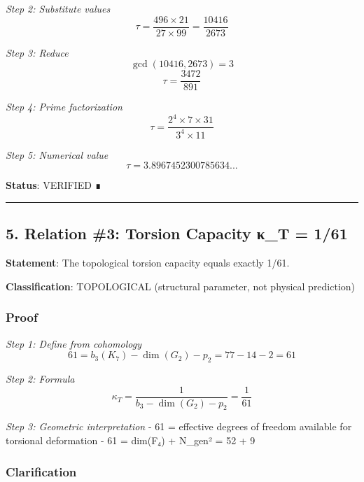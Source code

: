 \documentclass[11pt,a4paper]{article}
\begin{document}
\emph{Step 2: Substitute values}
\[\tau = \frac{496 \times 21}{27 \times 99} = \frac{10416}{2673}\]

\emph{Step 3: Reduce}
\[\gcd(10416, 2673) = 3\]
\[\tau = \frac{3472}{891}\]

\emph{Step 4: Prime factorization}
\[\tau = \frac{2^4 \times 7 \times 31}{3^4 \times 11}\]

\emph{Step 5: Numerical value}
\[\tau = 3.8967452300785634...\]

\textbf{Status}: VERIFIED ∎

\begin{center}\rule{0.5\linewidth}{0.5pt}\end{center}

\subsection{5. Relation \#3: Torsion Capacity κ\_T = 1/61}\label{relation-3-torsion-capacity-ux3ba_t-161}

\textbf{Statement}: The topological torsion capacity equals exactly 1/61.

\textbf{Classification}: TOPOLOGICAL (structural parameter, not physical prediction)

\subsubsection{Proof}\label{proof-1}

\emph{Step 1: Define from cohomology}
\[61 = b_3(K_7) - \dim(G_2) - p_2 = 77 - 14 - 2 = 61\]

\emph{Step 2: Formula}
\[\kappa_T = \frac{1}{b_3 - \dim(G_2) - p_2} = \frac{1}{61}\]

\emph{Step 3: Geometric interpretation}
- 61 = effective degrees of freedom available for torsional deformation
- 61 = dim(F₄) + N\_gen² = 52 + 9

\subsubsection{Clarification}\label{clarification}
\end{document}
